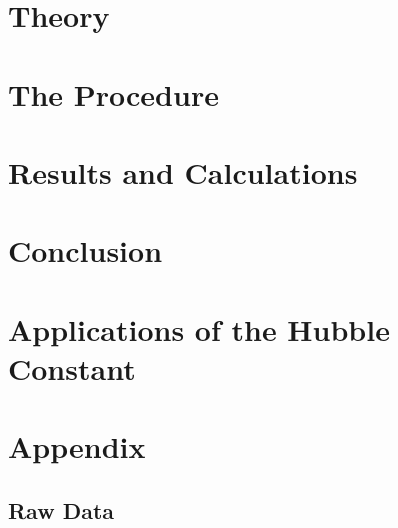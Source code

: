 \documentclass[12pt]{article}
\begin{document}


\section{Theory}

\cite{bbcresistance}


\section{The Procedure}



\section{Results and Calculations}



\section{Conclusion}



\section{Applications of the Hubble Constant}




\newpage






\newpage

\section*{Appendix}

\subsection*{Raw Data}

\listoffigures
\end{document}
